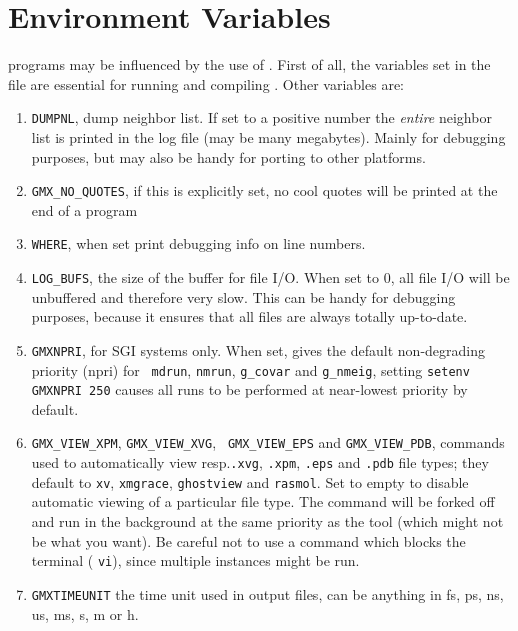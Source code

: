 \section{Environment Variables}
{\gromacs} programs may be influenced by the use of 
. 
First of all, the variables set in the  file
are essential for running and compiling {\gromacs}. Other variables are:
\begin{enumerate}
\item   {\tt DUMPNL}, dump neighbor list. 
        If set to a positive number the {\em entire}
        neighbor list is printed in the log file (may be many megabytes).
        Mainly for debugging purposes, but may also be handy for
        porting to other platforms.
\item   {\tt GMX_NO_QUOTES}, if this is explicitly set, no cool quotes
        will be printed at the end of a program
\item   {\tt WHERE}, when set print debugging info on line numbers.
\item   {\tt LOG_BUFS}, the size of the buffer for file I/O. When set
        to 0, all file I/O will be unbuffered and therefore very slow.
        This can be handy for debugging purposes, because it ensures
        that all files are always totally up-to-date.
\item   {\tt GMXNPRI}, for SGI systems only. When set, gives the
        default non-degrading priority (npri) for {\tt
        mdrun}, {\tt nmrun}, {\tt g_covar} and {\tt g_nmeig},
        {\eg}\@ setting \verb'setenv GMXNPRI 250' causes all
        runs to be performed at near-lowest priority by default.
\item   {\tt GMX_VIEW_XPM}, {\tt GMX_VIEW_XVG}, {\tt
        GMX_VIEW_EPS} and {\tt GMX_VIEW_PDB}, commands used to
        automatically view resp.\@ {\tt .xvg}, {\tt .xpm}, {\tt .eps}
        and {\tt .pdb} file types; they default to {\tt xv}, {\tt xmgrace},
        {\tt ghostview} and {\tt rasmol}. Set to empty to disable
        automatic viewing of a particular file type. The command will
        be forked off and run in the background at the same priority
        as the {\gromacs} tool (which might not be what you want).
        Be careful not to use a command which blocks the terminal
        ({\eg} {\tt vi}), since multiple instances might be run.
\item   {\tt GMXTIMEUNIT} the time unit used in output files, can be
        anything in fs, ps, ns, us, ms, s, m or h.
\end{enumerate}

